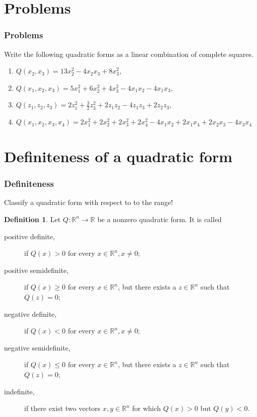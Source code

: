 \documentclass[aspectratio=169,notheorems]{corvinusmetropolis}
\theoremstyle{definition}
\newtheorem{definition}[theorem]{Definition}
\begin{document}
\section{Problems}
\begin{frame}
    \frametitle{Problems}
    \begin{block}{ Write the following quadratic forms as a linear combination of complete squares.}
        \begin{enumerate}
            \item 
            $Q\left( x_2,x_3 \right)=13x_2^2-4x_2x_3+8x_3^2$,
            \item
            $Q\left( x_1,x_2,x_3 \right)=5x_1^2+6x_2^2+4x_3^2-4x_1x_2-4x_1x_3$,
            \item
            $Q\left( z_1,z_2,z_3 \right)=2z_1^2+\frac{3}{2}z_3^2+2z_1z_2-4z_1z_3+2z_2z_3$,
            \item
            $Q\left( x_1,x_2,x_3,x_4 \right)=2x_1^2+2x_2^2+2x_3^2+2x_4^2-4x_1x_2+2x_1x_4+2x_2x_3-4x_3x_4$
        \end{enumerate}
    \end{block}
\end{frame}
\section{Definiteness of a quadratic form}
\begin{frame}
    \frametitle{Definiteness}
    Classify a quadratic form with respect to to the range!
    \begin{definition}
        Let $Q:\mathbb{R}^n\to\mathbb{R}$ be a nonzero quadratic form. It is called
        \begin{description}
            \item[positive definite,] if $Q\left( x \right)>0$ for every $x\in\mathbb{R}^n,x\neq 0$;
            \item[positive semidefinite,] if $ Q\left( x \right)\geq 0$ for every $x\in\mathbb{R}^n$,
                but there exists a $z\in\mathbb{R}^n$ such that $Q\left( z \right)=0$;
            \item[negative definite,] if $ Q\left( x \right)<0$ for every $x\in\mathbb{R}^n,x\neq 0;$
            \item[negative semidefinite,] if $ Q\left( x \right)\leq 0$ for every $x\in\mathbb{R}^n$,
                but there exists a $z\in\mathbb{R}^n$ such that $Q\left( z \right)=0$;
            \item[indefinite,] if there exist two vectors $x,y\in\mathbb{R}^n$ for which
                $Q\left( x \right)>0$ but $Q\left( y \right)<0$.
        \end{description}
    \end{definition}
\end{frame}
\end{document}
